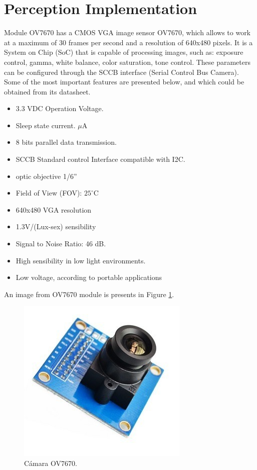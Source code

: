 \section{Perception Implementation}
Module OV7670\cite{OV7670} has a CMOS VGA image sensor OV7670, which allows to work at a maximum of 30 frames per second and a resolution of 640x480 pixels. It is a System on Chip (SoC) that is capable of processing images, such as: exposure control, gamma, white balance, color saturation, tone control. These parameters can be configured through the SCCB interface (Serial Control Bus Camera).
Some of the most important features are presented below, and which could be obtained from its datasheet\cite{OV7670}.

\begin{itemize}
	\item 3.3 VDC Operation Voltage. 
	\item Sleep state current. $\mu$A
	\item 8 bits parallel data transmission. 
	\item SCCB Standard control Interface compatible with I2C. 
	\item optic objective 1/6” 
	\item Field of View (FOV): $25^{\circ}$C
	\item 640x480 VGA resolution
	\item 1.3V/(Lux-sex) sensibility 
	\item Signal to Noise Ratio: 46 dB. 
	\item High sensibility in low light environments. 
	\item Low voltage, according to portable applications
\end{itemize}

An image from OV7670 module is presents in Figure \ref{fig:OV7670}.

\begin{figure}[H]
	\center
	\includegraphics[scale=0.4, angle=0]{imagenes/Cuadricoptero_vision/OV7670}
	\caption{Cámara OV7670.}
	\label{fig:OV7670}
\end{figure}

